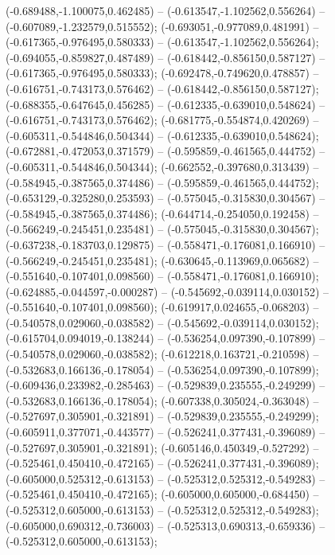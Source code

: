  (-0.689488,-1.100075,0.462485) -- (-0.613547,-1.102562,0.556264) -- (-0.607089,-1.232579,0.515552);
 (-0.693051,-0.977089,0.481991) -- (-0.617365,-0.976495,0.580333) -- (-0.613547,-1.102562,0.556264);
 (-0.694055,-0.859827,0.487489) -- (-0.618442,-0.856150,0.587127) -- (-0.617365,-0.976495,0.580333);
 (-0.692478,-0.749620,0.478857) -- (-0.616751,-0.743173,0.576462) -- (-0.618442,-0.856150,0.587127);
 (-0.688355,-0.647645,0.456285) -- (-0.612335,-0.639010,0.548624) -- (-0.616751,-0.743173,0.576462);
 (-0.681775,-0.554874,0.420269) -- (-0.605311,-0.544846,0.504344) -- (-0.612335,-0.639010,0.548624);
 (-0.672881,-0.472053,0.371579) -- (-0.595859,-0.461565,0.444752) -- (-0.605311,-0.544846,0.504344);
 (-0.662552,-0.397680,0.313439) -- (-0.584945,-0.387565,0.374486) -- (-0.595859,-0.461565,0.444752);
 (-0.653129,-0.325280,0.253593) -- (-0.575045,-0.315830,0.304567) -- (-0.584945,-0.387565,0.374486);
 (-0.644714,-0.254050,0.192458) -- (-0.566249,-0.245451,0.235481) -- (-0.575045,-0.315830,0.304567);
 (-0.637238,-0.183703,0.129875) -- (-0.558471,-0.176081,0.166910) -- (-0.566249,-0.245451,0.235481);
 (-0.630645,-0.113969,0.065682) -- (-0.551640,-0.107401,0.098560) -- (-0.558471,-0.176081,0.166910);
 (-0.624885,-0.044597,-0.000287) -- (-0.545692,-0.039114,0.030152) -- (-0.551640,-0.107401,0.098560);
 (-0.619917,0.024655,-0.068203) -- (-0.540578,0.029060,-0.038582) -- (-0.545692,-0.039114,0.030152);
 (-0.615704,0.094019,-0.138244) -- (-0.536254,0.097390,-0.107899) -- (-0.540578,0.029060,-0.038582);
 (-0.612218,0.163721,-0.210598) -- (-0.532683,0.166136,-0.178054) -- (-0.536254,0.097390,-0.107899);
 (-0.609436,0.233982,-0.285463) -- (-0.529839,0.235555,-0.249299) -- (-0.532683,0.166136,-0.178054);
 (-0.607338,0.305024,-0.363048) -- (-0.527697,0.305901,-0.321891) -- (-0.529839,0.235555,-0.249299);
 (-0.605911,0.377071,-0.443577) -- (-0.526241,0.377431,-0.396089) -- (-0.527697,0.305901,-0.321891);
 (-0.605146,0.450349,-0.527292) -- (-0.525461,0.450410,-0.472165) -- (-0.526241,0.377431,-0.396089);
 (-0.605000,0.525312,-0.613153) -- (-0.525312,0.525312,-0.549283) -- (-0.525461,0.450410,-0.472165);
 (-0.605000,0.605000,-0.684450) -- (-0.525312,0.605000,-0.613153) -- (-0.525312,0.525312,-0.549283);
 (-0.605000,0.690312,-0.736003) -- (-0.525313,0.690313,-0.659336) -- (-0.525312,0.605000,-0.613153);
